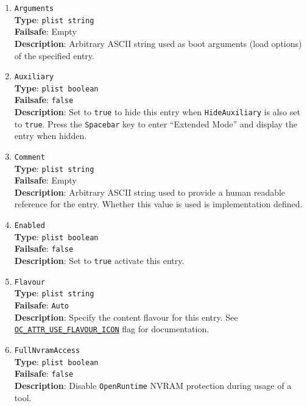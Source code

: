 \documentclass[]{article}
\begin{document}
\begin{enumerate}

\item
  \texttt{Arguments}\\
  \textbf{Type}: \texttt{plist\ string}\\
  \textbf{Failsafe}: Empty\\
  \textbf{Description}: Arbitrary ASCII string used as boot arguments (load options)
  of the specified entry.

\item
  \texttt{Auxiliary}\\
  \textbf{Type}: \texttt{plist\ boolean}\\
  \textbf{Failsafe}: \texttt{false}\\
  \textbf{Description}: Set to \texttt{true} to hide this entry
  when \texttt{HideAuxiliary} is also set to \texttt{true}.
  Press the \texttt{Spacebar} key to enter ``Extended Mode'' and display the entry when hidden.

\item
  \texttt{Comment}\\
  \textbf{Type}: \texttt{plist\ string}\\
  \textbf{Failsafe}: Empty\\
  \textbf{Description}: Arbitrary ASCII string used to provide a human readable
  reference for the entry. Whether this value is used is implementation defined.

\item
  \texttt{Enabled}\\
  \textbf{Type}: \texttt{plist\ boolean}\\
  \textbf{Failsafe}: \texttt{false}\\
  \textbf{Description}: Set to \texttt{true} activate this entry.

\item
  \texttt{Flavour}\\
  \textbf{Type}: \texttt{plist\ string}\\
  \textbf{Failsafe}: \texttt{Auto}\\
  \textbf{Description}: Specify the content flavour for this entry.
  See \hyperref[oc-attr-use-flavour-icon]{\texttt{OC\_ATTR\_USE\_FLAVOUR\_ICON}} flag for documentation.

\item
  \texttt{FullNvramAccess}\\
  \textbf{Type}: \texttt{plist\ boolean}\\
  \textbf{Failsafe}: \texttt{false}\\
  \textbf{Description}: Disable \texttt{OpenRuntime} NVRAM protection during usage of a tool.


\end{enumerate}
\end{document}
